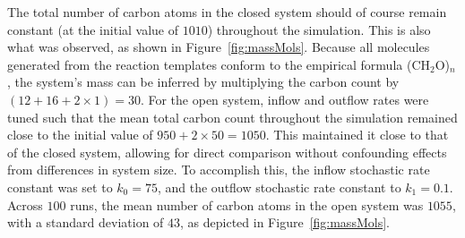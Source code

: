 The total number of carbon atoms in the closed system should of course remain constant (at the initial value of $1010$) throughout the simulation. This is also what was observed, as shown in Figure~\ref{fig:massMols}. Because all molecules generated from the reaction templates conform to the empirical formula (CH$_2$O)$_n$, the system’s mass can be inferred by multiplying the carbon count by $(12+16+2\times 1) = 30$. For the open system, inflow and outflow rates were tuned such that the mean total carbon count throughout the simulation remained close to the initial value of $950 + 2 \times 50 = 1050$. This maintained it close to that of the closed system, allowing for direct comparison without confounding effects from differences in system size. To accomplish this, the inflow stochastic rate constant was set to $k_0 = 75$, and the outflow stochastic rate constant to $k_1 = 0.1$. Across $100$ runs, the mean number of carbon atoms in the open system was $1055$, with a standard deviation of $43$, as depicted in Figure~\ref{fig:massMols}.

